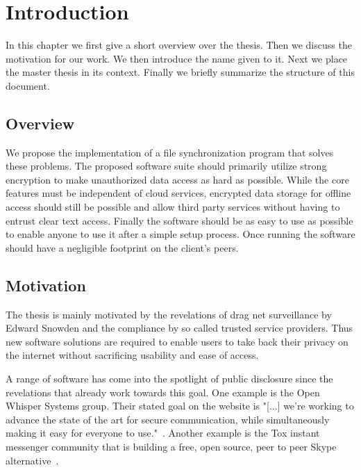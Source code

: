 \chapter{Introduction}
\label{chap:intro}

In this chapter we first give a short overview over the thesis.
Then we discuss the motivation for our work.
We then introduce the name given to it.
Next we place the master thesis in its context.
Finally we briefly summarize the structure of this document.

\section{Overview}

We propose the implementation of a file synchronization program that solves these problems.
The proposed software suite should primarily utilize strong encryption to make unauthorized data access as hard as possible.
While the core features must be independent of cloud services, encrypted data storage for offline access should still be possible and allow third party services without having to entrust clear text access.
Finally the software should be as easy to use as possible to enable anyone to use it after a simple setup process.
Once running the software should have a negligible footprint on the client's peers.

\section{Motivation}
\label{sec:Motivation}

The thesis is mainly motivated by the revelations of drag net surveillance by Edward Snowden and the compliance by so called trusted service providers.
Thus new software solutions are required to enable users to take back their privacy on the internet without sacrificing usability and ease of access.

A range of software has come into the spotlight of public disclosure since the revelations that already work towards this goal.
One example is the Open Whisper Systems group.
Their stated goal on the website is "[...] we're working to advance the state of the art for secure communication, while simultaneously making it easy for everyone to use."~\cite{web:site:whispersystems:about}.
Another example is the Tox instant messenger community that is building a free, open source, peer to peer Skype alternative~\cite{web:site:tox}.

